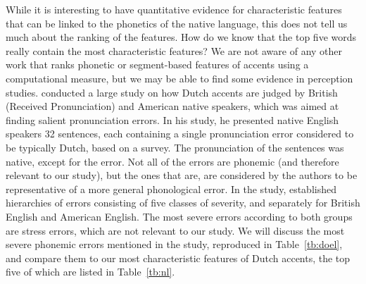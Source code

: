 \documentclass[output=paper]{LSP/langsci}
\begin{document}
While it is interesting to have quantitative evidence for characteristic features that can be linked to the phonetics of the native language, this does not tell us much about the ranking of the features. How do we know that the top five words really contain the most characteristic features? We are not aware of any other work that ranks phonetic or segment-based features of accents using a computational measure, but we may be able to find some evidence in perception studies. \citet{van_den_doel_evaluation_2006} conducted a large study on how Dutch accents are judged by British (Received Pronunciation) and American native speakers, which was aimed at finding salient pronunciation errors. In his study, he presented native English speakers 32 sentences, each containing a single pronunciation error considered to be typically Dutch, based on a survey. The pronunciation of the sentences was native, except for the error. Not all of the errors are phonemic (and therefore relevant to our study), but the ones that are, are considered by the authors to be representative of a more general phonological error. In the study, \citet[292]{van_den_doel_evaluation_2006} established hierarchies of errors consisting of five classes of severity, and separately for British English and American English. The most severe errors according to both groups are stress errors, which are not relevant to our study. We will discuss the most severe phonemic errors mentioned in the study, reproduced in Table~\ref{tb:doel}, and compare them to our most characteristic features of Dutch accents, the top five of which are listed in Table~\ref{tb:nl}.
\end{document}
